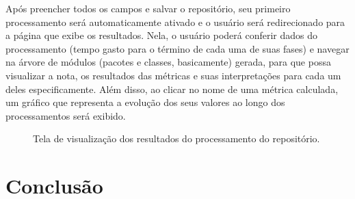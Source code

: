 \documentclass[12pt]{article}
\begin{document}
    Após preencher todos os campos e salvar o repositório, seu primeiro processamento será automaticamente ativado e o usuário será redirecionado para a página que exibe os resultados. Nela, o usuário poderá conferir dados do processamento (tempo gasto para o término de cada uma de suas fases) e navegar na árvore de módulos (pacotes e classes, basicamente) gerada, para que possa visualizar a nota, os resultados das métricas e suas interpretações para cada um deles especificamente. Além disso, ao clicar no nome de uma métrica calculada, um gráfico que representa a evolução dos seus valores ao longo dos processamentos será exibido.

\pagebreak

    \begin{figure}[h!]
      \centering
      \caption{Tela de visualização dos resultados do processamento do repositório.}
      \label{fig:choose-metric}
    \end{figure}

\section{Conclusão}

\newpage


\end{document}
